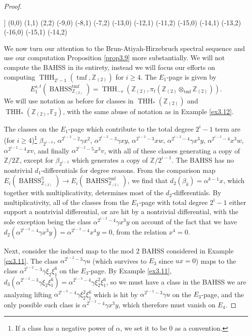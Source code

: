 \documentclass[11pt,leqno]{article}
\newcommand{\zz}{\mathbb{Z}}
\newcommand{\sss}{\mathbb{S}}
\newcommand{\fff}{\mathbb{F}}
\DeclareMathOperator{\THH}{THH}
\DeclareMathOperator{\tmf}{tmf}
\newcommand{\mo}[1]{\operatorname{#1}}
\newtheorem*{short hand}{theorem name}
\theoremstyle{plain}  %
\theoremstyle{definition}
\numberwithin{equation}{section}
\begin{document}
\begin{proof}
\begin{center}
\begin{sseqpage}
		]
		\class["1"](0,0)
		\class["\tilde{v}_0"](1,1)
		\class["\tilde{v}_0^2"](2,2)
		\class["\lambda_1"](-9,0)
		(-8,1)
		(-7,2)
		\class["\lambda_2"](-13,0)
		(-12,1)
		(-11,2)
		\class["\lambda_3"](-15,0)
		(-14,1)
		(-13,2)
		\class["\beta"](-16,0)
		(-15,1)
		(-14,2)
	\end{sseqpage}
\end{center}
\indent We now turn our attention to the Brun-Atiyah-Hirzebruch spectral sequence and use our computation Proposition \ref{prop3.9} more substantially.  We will not compute the BAHSS in its entirety, instead we will focus our efforts on computing $\THH_{2^{i}-1}(\tmf,\zz_{(2)})$ for $i\geq 4$.  The $E_1$-page is given by $$E_1^{s,t}(\mo{BAHSS}_{\zz_{(2)}}^{\tmf})=\THH_{-s}(\zz_{(2)},\pi_{t}(\zz_{(2)}\otimes_{\tmf}\zz_{(2)})).$$  We will use notation as before for classes in $\THH_*(\zz_{(2)})$ and $\THH_*(\zz_{(2)},\fff_2)$, with the same abuse of notation as in Example \ref{ex3.12}.


The classes on the $E_1$-page which contribute to the total degree $2^{i}-1$ term are (for $i\geq 4$)\footnote{If a class has a negative power of $\alpha$, we set it to be 0 as a convention.} $\beta_{2^{i-2}}$, $\alpha^{2^{i-2}-2}\gamma x^2$, $ \alpha^{2^{i-2}-3}\gamma xy$, $ \alpha^{2^{i-2}-3}xw$, $ \alpha^{2^{i-2}-4}\gamma x^3y$, $ \alpha^{2^{i-2}-4} x^3w$,$ \alpha^{2^{i-2}-4} xv$, and finally $\alpha^{2^{i-2}-5}x^3v$, with all of these classes generating a copy of $\zz/2\zz$, except for $\beta_{2^{i-2}}$ which generates a copy of $\zz/2^{i-1}$.  The BAHSS has no nontrivial $d_1$-differentials for degree reasons.  From the comparison map $E_i(\mo{BAHSS}_{\zz_{(2)}}^{\sss})\to E_i(\mo{BAHSS}_{\zz_{(2)}}^{\tmf})$, we find that $d_2(\beta_k)=\alpha^{k-1}x$, which together with multiplicativity, determines most of the $d_2$-differentials.   By multiplicativity, all of the classes from the $E_1$-page with total degree $2^{i}-1$ either support a nontrivial differential, or are hit by a nontrivial differential, with the sole exception being the class $\alpha^{2^{i-2}-4}\gamma x^3y$ on account of the fact that we have $d_2(\alpha^{2^{i-2}-4}\gamma x^3y)=\alpha^{2^{i-2}-4}x^4y=0$, from the relation $x^4=0$.

Next, consider the induced map to the mod 2 BAHSS considered in Example \ref{ex3.11}.  The class $\alpha^{2^{i-2}-3}\gamma u$ (which survives to $E_3$ since $ux=0$) maps to the class $\alpha^{2^{i-2}-3}\gamma \xi_2\xi_1^6$ on the $E_3$-page.  By Example \ref{ex3.11}, $d_3(\alpha^{2^{i-2}-3}\gamma \xi_2\xi_1^6)=\alpha^{2^{i-3}-4}\gamma\xi_2^2\xi_1^6$, so we must have a class in the BAHSS we are analyzing lifting $\alpha^{2^{i-3}-4}\gamma\xi_2^2\xi_1^6$ which is hit by $\alpha^{2^{i-2}-3}\gamma u$ on the $E_3$-page, and the only possible such class is $\alpha^{2^{i-2}-4}\gamma x^3y$, which therefore must vanish on $E_4$.


\end{proof}
\end{document}
